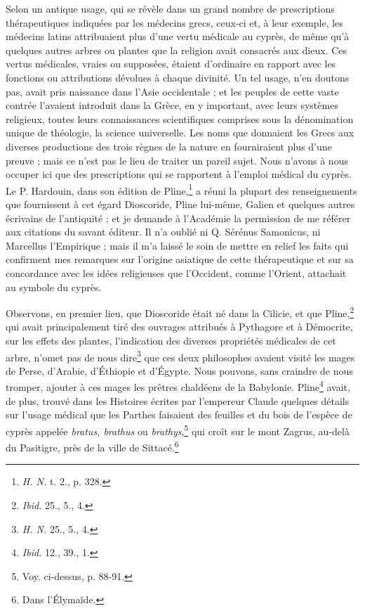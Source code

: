 \documentclass{article}
\begin{document}
Selon un antique usage, qui se révèle dans un grand nombre de prescriptions thérapeutiques indiquées par les médecins grecs, ceux-ci et, à leur exemple, les médecins latins attribuaient plus d'une vertu médicale au cyprès, de même qu'à quelques autres arbres ou plantes que la religion avait consacrés aux dieux. Ces vertus médicales, vraies ou supposées, étaient d'ordinaire en rapport avec les fonctions ou attributions dévolues à chaque divinité. Un tel usage, n'en doutons pas, avait pris naissance dans l'Asie occidentale ; et les peuples de cette vaste contrée l'avaient introduit dans la Grèce, en y important, avec leurs systèmes religieux, toutes leurs connaissances scientifiques comprises sous la dénomination unique de théologie, la science universelle. Les noms que donnaient les Grecs aux diverses productions des trois règnes de la nature en fourniraient plus d'une preuve ; mais ce n'est pas le lieu de traiter un pareil sujet. Nous n'avons à nous occuper ici que des prescriptions qui se rapportent à l'emploi médical du cyprès. Le P. Hardouin, dans son édition de Pline,\footnote{\emph{H. N.} t. 2., p. 328.} a réuni la plupart des renseignements que fournissent à cet égard Dioscoride, Pline lui-même, Galien et quelques autres écrivains de l'antiquité ; et je demande à l'Académie la permission de me référer aux citations du savant éditeur. Il n'a oublié ni Q. Sérénus Samonicus, ni Marcellus l'Empirique ; mais il m'a laissé le soin de mettre en relief les faits qui confirment mes remarques sur l'origine asiatique de cette thérapeutique et sur sa concordance avec les idées religieuses que l'Occident, comme l'Orient, attachait au symbole du cyprès.

Observons, en premier lieu, que Dioscoride était né dans la Cilicie, et que Pline,\footnote{\emph{Ibid.} 25., 5., 4.} qui avait principalement tiré des ouvrages attribués à Pythagore et à Démocrite, sur les effets des plantes, l'indication des diverses propriétés médicales de cet arbre, n'omet pas de nous dire\footnote{\emph{H. N.} 25., 5., 4.} que ces deux philosophes avaient visité les mages de Perse, d'Arabie, d'Éthiopie et d'Égypte. Nous pouvons, sans craindre de nous tromper, ajouter à ces mages les prêtres chaldéens de la Babylonie. Pline\footnote{\emph{Ibid.} 12., 39., 1.} avait, de plus, trouvé dans les Histoires écrites par l'empereur Claude quelques détails sur l'usage médical que les Parthes faisaient des feuilles et du bois de l'espèce de cyprès appelée \emph{bratus, brathus} ou \emph{brathys},\footnote{Voy. ci-dessus, p. 88-91.} qui croît sur le mont Zagrus, au-delà du Pasitigre, près de la ville de Sittacé.\footnote{Dans l'Élymaïde.}
\end{document}
